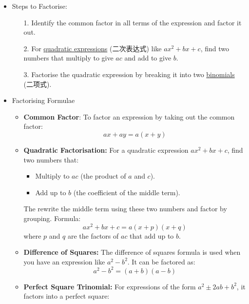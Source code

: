 \begin{itemize}
    \item Steps to Factorise:
    \begin{itemize}
        \item[1.] Identify the common factor in all terms of the expression and factor it out.
        \item[2.] For \underline{quadratic expressions} (二次表达式) like $ax^2 + bx + c$, find two numbers that multiply to give
        $ac$ and add to give $b$.
        \item[3.] Factorise the quadratic expression by breaking it into two \underline{binomials} (二项式).
    \end{itemize}
    \item Factorising Formulae
    \begin{itemize}
        \item \textbf{Common Factor}: To factor an expression by taking out the common factor:
        \begin{equation}
            ax + ay = a\left(x + y\right)
        \end{equation}
        \item \textbf{Quadratic Factorisation:} For a quadratic expression $ax^2 + bx + c$, find two numbers that:
        \begin{itemize}
            \item Multiply to $ac$ (the product of $a$ and $c$).
            \item Add up to $b$ (the coefficient of the middle term).
        \end{itemize}
        The rewrite the middle term using these two numbers and factor by grouping. Formula:
        \begin{equation}
            ax^2 + bx + c = a\left(x + p\right)\left(x + q\right)
        \end{equation}
        where $p$ and $q$ are the factors of $ac$ that add up to $b$.
        \item \textbf{Difference of Squares:} The difference of squares formula is used when you have an expression like
        $a^2 - b^2$. It can be factored as:
        \begin{equation}
            a^2 - b^2 = \left(a + b\right)\left(a - b\right)
        \end{equation}
        \item \textbf{Perfect Square Trinomial:} For expressions of the form $a^2 \pm 2ab + b^2$, it factors into a perfect
        square:
        \begin{equation}

\end{equation}
\end{itemize}
\end{itemize}
